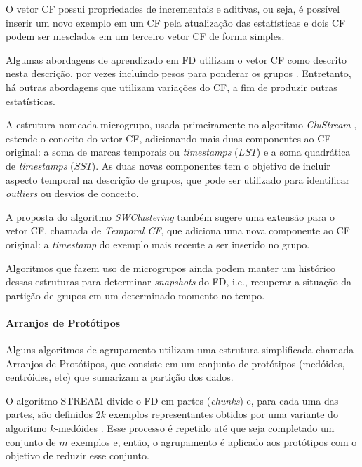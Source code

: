 O vetor CF possui propriedades de incrementais e aditivas, ou seja, é possível inserir um novo exemplo em um CF pela atualização das estatísticas e dois CF podem ser mesclados em um terceiro vetor CF de forma simples.

Algumas abordagens de aprendizado em FD utilizam o vetor CF como descrito nesta descrição, por vezes incluindo pesos para ponderar os grupos \cite{Cao2006,Kranen2011}. Entretanto, há outras abordagens que utilizam variações do CF, a fim de produzir outras estatísticas.

A estrutura nomeada microgrupo, usada primeiramente no algoritmo \emph{CluStream} \cite{Aggarwal2003}, estende o conceito do vetor CF, adicionando mais duas componentes ao CF original: a soma de marcas temporais ou \emph{timestamps} ($LST$) e a soma quadrática de \emph{timestamps} ($SST$). As duas novas componentes tem o objetivo de incluir aspecto temporal na descrição de grupos, que pode ser utilizado para identificar \emph{outliers} ou desvios de conceito.

A proposta do algoritmo \emph{SWClustering} \cite{Zhou2008} também sugere uma extensão para o vetor CF, chamada de \emph{Temporal CF}, que adiciona uma nova componente ao CF original: a \emph{timestamp} do exemplo mais recente a ser inserido no grupo.

Algoritmos que fazem uso de microgrupos ainda podem manter um histórico dessas estruturas para determinar \emph{snapshots} do FD, i.e., recuperar a situação da partição de grupos em um determinado momento no tempo. \cite{aggarwal2007:Ch2}

\paragraph{Arranjos de Protótipos \\}

Alguns algoritmos de agrupamento utilizam uma estrutura simplificada chamada Arranjos de Protótipos, que consiste em um conjunto de protótipos (medóides, centróides, etc) que sumarizam a partição dos dados.

O algoritmo STREAM \cite{Guha2000} divide o FD em partes (\emph{chunks}) e, para cada uma das partes, são definidos $2k$ exemplos representantes obtidos por uma variante do algoritmo $k$-medóides \cite{Kaufman1990}. Esse processo é repetido até que seja completado um conjunto de $m$ exemplos e, então, o agrupamento é aplicado aos protótipos com o objetivo de reduzir esse conjunto.

